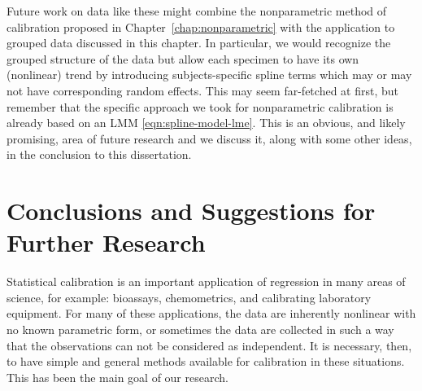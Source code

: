 \documentclass[cmfont,usenames,dvipsnames,leqno]{afit-etd}\usepackage[]{graphicx}\usepackage[]{color}
\begin{document}
% 


Future work on data like these might combine the nonparametric method of calibration proposed in Chapter~\ref{chap:nonparametric} with the application to grouped data discussed in this chapter. In particular, we would recognize the grouped structure of the data but allow each specimen to have its own (nonlinear) trend by introducing subjects-specific spline terms which may or may not have corresponding random effects. This may seem far-fetched at first, but remember that the specific approach we took for nonparametric calibration is already based on an \ac{LMM} \eqref{eqn:spline-model-lme}. This is an obvious, and likely promising, area of future research and we discuss it, along with some other ideas, in the conclusion to this dissertation.





\chapter{Conclusions and Suggestions for Further Research}
\label{chp:conclusion}
Statistical calibration is an important application of regression in many areas of science, for example: bioassays, chemometrics, and calibrating laboratory equipment. For many of these applications, the data are inherently nonlinear with no known parametric form, or sometimes the data are collected in such a way that the observations can not be considered as independent. It is necessary, then, to have simple and general methods available for calibration in these situations. This has been the main goal of our research.
\end{document}
